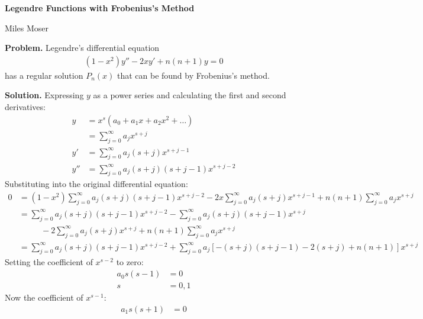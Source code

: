 \documentclass{article}
\newcommand{\Title}     {Legendre Functions with Frobenius's Method}
\newcommand{\Author}   {Miles Moser}
\begin{document}
{\Large\bf\Title}

\hfill \Author

\textbf{Problem.} Legendre's differential equation
\begin{equation*}
\begin{aligned}
	(1-x^2)y'' - 2xy' + n(n+1)y = 0
\end{aligned}
\end{equation*}
has a regular solution $P_n(x)$ that can be found by Frobenius's method.

\textbf{Solution.} Expressing $y$ as a power series and calculating the first and second derivatives:
\begin{equation*}
\begin{aligned}
	y &= x^s(a_0 + a_1 x + a_2 x^2 + \dots ) \\
	  &= \sum_{j=0}^\infty a_j x^{s+j} \\
	y' &= \sum_{j=0}^\infty a_j(s+j)  x^{s+j-1}\\
	y'' &= \sum_{j=0}^\infty a_j(s+j)(s+j-1) x^{s+j-2}
\end{aligned}
\end{equation*}
Substituting into the original differential equation:
\begin{equation*}
\begin{aligned}
	0 &= (1-x^2)\sum_{j=0}^\infty a_j(s+j)(s+j-1) x^{s+j-2} - 2x\sum_{j=0}^\infty a_j(s+j)  x^{s+j-1} + n(n+1)\sum_{j=0}^\infty a_j x^{s+j} \\
	&= \sum_{j=0}^\infty a_j(s+j)(s+j-1) x^{s+j-2} - \sum_{j=0}^\infty a_j(s+j)(s+j-1) x^{s+j} \\
	&\phantom{==}- 2\sum_{j=0}^\infty a_j(s+j)  x^{s+j} + n(n+1)\sum_{j=0}^\infty a_j x^{s+j} \\
	&= \sum_{j=0}^\infty a_j(s+j)(s+j-1) x^{s+j-2} + \sum_{j=0}^\infty a_j\left[-(s+j)(s+j-1)-2(s+j)+n(n+1)\right]x^{s+j}
\end{aligned}
\end{equation*}
Setting the coefficient of $x^{s-2}$ to zero:
\begin{equation*}
\begin{aligned}
	a_0 s(s-1) &= 0 \\
	s &= 0, 1
\end{aligned}
\end{equation*}
Now the coefficient of $x^{s-1}$:
\begin{equation*}
\begin{aligned}
	a_1s(s+1) &= 0 \\
\end{aligned}
\end{equation*}
\end{document}
